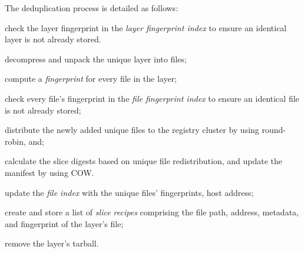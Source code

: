 The deduplication process is detailed as follows:
\begin{compactenumerate}
	\item  check the layer fingerprint in the \emph{layer fingerprint index} to ensure 
	an identical layer is not already stored.
	\item decompress and unpack the unique layer into files;
	\item compute a \emph{fingerprint} for every file in the layer;
	\item check every file's fingerprint in the \emph{file fingerprint index} to
	ensure an identical file is not already stored;
	\item distribute the newly added unique files to the registry cluster by using round-robin, and;
	 \item calculate the slice digests based on unique file redistribution, and
	 update the manifest by using COW. 
	 \item update the \emph{file index} with the unique files' fingerprints, host address;
	\item create and store a list of \emph{slice recipes} comprising the file path, address,
	metadata, and fingerprint of the layer's file; 
	\item remove the layer's tarball.
\end{compactenumerate}

%
%

